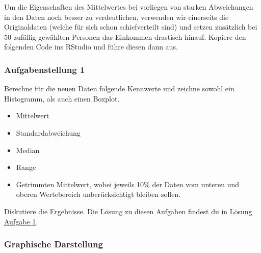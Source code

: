 \documentclass[]{article}
\newenvironment{Shaded}{\begin{snugshade}}{\end{snugshade}}
\newcommand{\KeywordTok}[1]{\textcolor[rgb]{0.13,0.29,0.53}{\textbf{#1}}}
\newcommand{\DecValTok}[1]{\textcolor[rgb]{0.00,0.00,0.81}{#1}}
\newcommand{\StringTok}[1]{\textcolor[rgb]{0.31,0.60,0.02}{#1}}
\newcommand{\OperatorTok}[1]{\textcolor[rgb]{0.81,0.36,0.00}{\textbf{#1}}}
\newcommand{\NormalTok}[1]{#1}
\providecommand{\tightlist}{%
  \setlength{\itemsep}{0pt}\setlength{\parskip}{0pt}}
\begin{document}
Um die Eigenschaften des Mittelwertes bei vorliegen von starken
Abweichungen in den Daten noch besser zu verdeutlichen, verwenden wir
einerseits die Originaldaten (welche für sich schon schiefverteilt sind)
und setzen zusätzlich bei 50 zufällig gewählten Personen das Einkommen
drastisch hinauf. Kopiere den folgenden Code ins RStudio und führe
diesen dann aus.

\begin{Shaded}
\end{Shaded}

\hypertarget{aufgabenstellung-1}{\subsubsection*{Aufgabenstellung
1}\label{aufgabenstellung-1}}

Berechne für die neuen Daten folgende Kennwerte und zeichne sowohl ein
Histogramm, als auch einen Boxplot.

\begin{itemize}
\tightlist
\item
  Mittelwert
\item
  Standardabweichung
\item
  Median
\item
  Range
\item
  Getrimmten Mittelwert, wobei jeweils 10\% der Daten vom unteren und
  oberen Wertebereich unberücksichtigt bleiben sollen.
\end{itemize}

Diskutiere die Ergebnisse. Die Lösung zu diesen Aufgaben findest du in
\protect\hyperlink{aufgabe_1}{Lösung Aufgabe 1}.

\subsubsection*{Graphische Darstellung}\label{graphische-darstellung}
\end{document}
